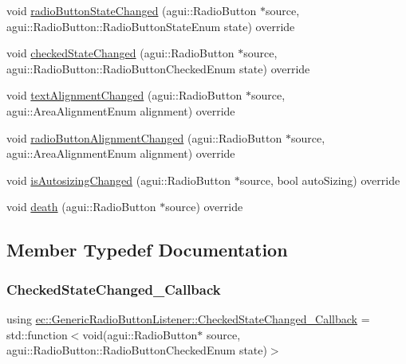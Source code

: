 \begin{DoxyCompactItemize}
\item 
void \mbox{\hyperlink{classec_1_1_generic_radio_button_listener_a6bf0c1bac860be217d9ca235613263b7}{radio\+Button\+State\+Changed}} (agui\+::\+Radio\+Button $\ast$source, agui\+::\+Radio\+Button\+::\+Radio\+Button\+State\+Enum state) override
\item 
void \mbox{\hyperlink{classec_1_1_generic_radio_button_listener_aa63b18d180a67d43d15311b351cbafb0}{checked\+State\+Changed}} (agui\+::\+Radio\+Button $\ast$source, agui\+::\+Radio\+Button\+::\+Radio\+Button\+Checked\+Enum state) override
\item 
void \mbox{\hyperlink{classec_1_1_generic_radio_button_listener_a324705c5155f71e01104399b12a95b8f}{text\+Alignment\+Changed}} (agui\+::\+Radio\+Button $\ast$source, agui\+::\+Area\+Alignment\+Enum alignment) override
\item 
void \mbox{\hyperlink{classec_1_1_generic_radio_button_listener_ac325d7d75fc038078368ab34addb1793}{radio\+Button\+Alignment\+Changed}} (agui\+::\+Radio\+Button $\ast$source, agui\+::\+Area\+Alignment\+Enum alignment) override
\item 
void \mbox{\hyperlink{classec_1_1_generic_radio_button_listener_a41958342697556ad6aad28d03bbd1d51}{is\+Autosizing\+Changed}} (agui\+::\+Radio\+Button $\ast$source, bool auto\+Sizing) override
\item 
void \mbox{\hyperlink{classec_1_1_generic_radio_button_listener_ab5fee70ab046379a87fd047a77de64df}{death}} (agui\+::\+Radio\+Button $\ast$source) override
\end{DoxyCompactItemize}


\subsection{Member Typedef Documentation}
\mbox{\label{classec_1_1_generic_radio_button_listener_aa2ce6fc7dec8cfb263608c59f6eb338f}} 
\subsubsection{\texorpdfstring{Checked\+State\+Changed\+\_\+\+Callback}{CheckedStateChanged\_Callback}}
{\footnotesize\ttfamily using \mbox{\hyperlink{classec_1_1_generic_radio_button_listener_aa2ce6fc7dec8cfb263608c59f6eb338f}{ec\+::\+Generic\+Radio\+Button\+Listener\+::\+Checked\+State\+Changed\+\_\+\+Callback}} =  std\+::function$<$void(agui\+::\+Radio\+Button$\ast$ source, agui\+::\+Radio\+Button\+::\+Radio\+Button\+Checked\+Enum state)$>$}

